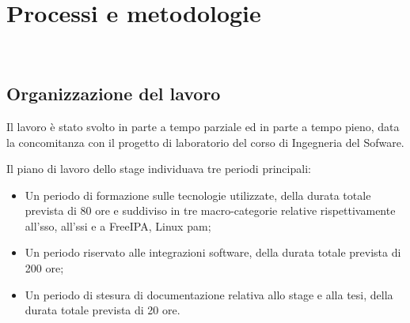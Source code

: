 
\chapter{Processi e metodologie}
\label{cap:processi-metodologie}

\\

\section{Organizzazione del lavoro}

Il lavoro è stato svolto in parte a tempo parziale ed in parte a tempo pieno, data la concomitanza con il progetto di laboratorio del corso di Ingegneria del Sofware. 

Il piano di lavoro dello stage individuava tre periodi principali:

\begin{itemize}
    \item Un periodo di formazione sulle tecnologie utilizzate, della durata totale prevista di 80 ore e suddiviso in tre macro-categorie relative rispettivamente all'\acrshort{sso}, all'\acrshort{ssi} e a FreeIPA, Linux \acrshort{pam};
    \item Un periodo riservato alle integrazioni software, della durata totale prevista di 200 ore;
    \item Un periodo di stesura di documentazione relativa allo stage e alla tesi, della durata totale prevista di 20 ore.
\end{itemize}




